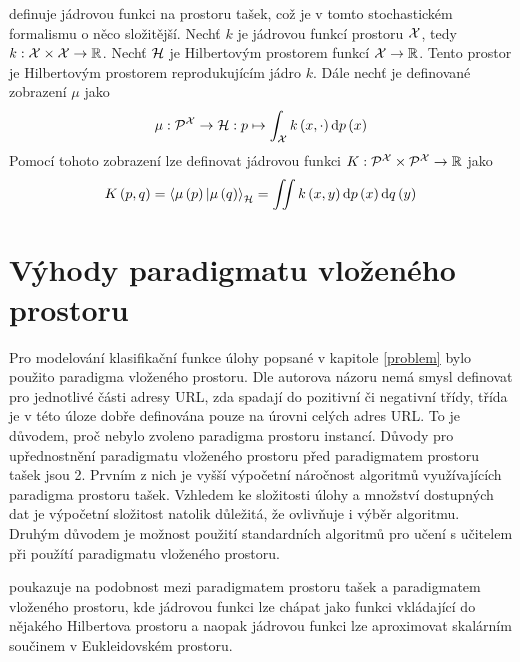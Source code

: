 \cite{muandet_learning_2012} definuje jádrovou funkci na prostoru tašek, což je v tomto stochastickém formalismu o něco složitější. Nechť \( k \) je jádrovou funkcí prostoru \( \mathcal X \), tedy \( k : \mathcal X \times \mathcal X \to \mathbb R \). Nechť \( \mathcal H \) je Hilbertovým prostorem funkcí \( \mathcal X \to \mathbb R \). Tento prostor je Hilbertovým prostorem reprodukujícím jádro \( k \). Dále nechť je definované zobrazení \( \mu \) jako
\[ \mu : \mathcal P^{\mathcal X} \to \mathcal H : p \mapsto \int_{\mathcal X} k \left( x, \cdot \right) \mathrm{d}p \left( x \right) \]
Pomocí tohoto zobrazení lze definovat jádrovou funkci \( K : \mathcal P^{\mathcal X} \times \mathcal P^{\mathcal X} \to \mathbb R \) jako
\[ K \left( p, q \right) = \braket{\mu \left( p \right) | \mu \left( q \right)}_{\mathcal H} = \iint k \left( x, y \right) \mathrm{d} p \left( x \right) \mathrm{d} q \left( y \right) \]

\section{Výhody paradigmatu vloženého prostoru}
Pro modelování klasifikační funkce úlohy popsané v kapitole \ref{problem} bylo použito paradigma vloženého prostoru. Dle autorova názoru nemá smysl definovat pro jednotlivé části adresy URL, zda spadají do pozitivní či negativní třídy, třída je v této úloze dobře definována pouze na úrovni celých adres URL. To je důvodem, proč nebylo zvoleno paradigma prostoru instancí. Důvody pro upřednostnění paradigmatu vloženého prostoru před paradigmatem prostoru tašek jsou 2. Prvním z nich je vyšší výpočetní náročnost algoritmů využívajících paradigma prostoru tašek. Vzhledem ke složitosti úlohy a množství dostupných dat je výpočetní složitost natolik důležitá, že ovlivňuje i výběr algoritmu. Druhým důvodem je možnost použití standardních algoritmů pro učení s učitelem při použítí paradigmatu vloženého prostoru.
\begin{remark}
	\cite{pevny_using_2016} poukazuje na podobnost mezi paradigmatem prostoru tašek a paradigmatem vloženého prostoru, kde jádrovou funkci lze chápat jako funkci vkládající do nějakého Hilbertova prostoru a naopak jádrovou funkci lze aproximovat skalárním součinem v Eukleidovském prostoru.
\end{remark}
